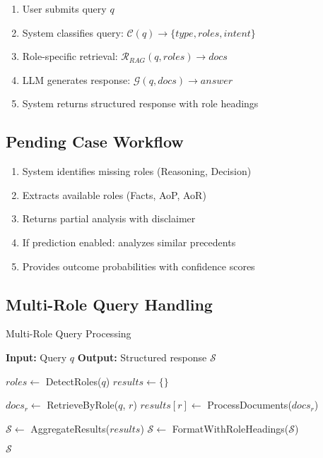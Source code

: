 \documentclass[12pt,a4paper]{article}
\begin{document}
\begin{enumerate}
    \item User submits query $q$
    \item System classifies query: $\mathcal{C}(q) \rightarrow \{type, roles, intent\}$
    \item Role-specific retrieval: $\mathcal{R}_{RAG}(q, roles) \rightarrow docs$
    \item LLM generates response: $\mathcal{G}(q, docs) \rightarrow answer$
    \item System returns structured response with role headings
\end{enumerate}

\subsection{Pending Case Workflow}

\begin{enumerate}
    \item System identifies missing roles (Reasoning, Decision)
    \item Extracts available roles (Facts, AoP, AoR)
    \item Returns partial analysis with disclaimer
    \item If prediction enabled: analyzes similar precedents
    \item Provides outcome probabilities with confidence scores
\end{enumerate}

\subsection{Multi-Role Query Handling}

\begin{algorithm}
\caption{Multi-Role Query Processing}
\begin{algorithmic}[1]
\STATE \textbf{Input:} Query $q$
\STATE \textbf{Output:} Structured response $\mathcal{S}$

\STATE $roles \leftarrow$ DetectRoles($q$)
\STATE $results \leftarrow \{\}$

    \STATE $docs_r \leftarrow$ RetrieveByRole($q$, $r$)
    \STATE $results[r] \leftarrow$ ProcessDocuments($docs_r$)
\ENDFOR

\STATE $\mathcal{S} \leftarrow$ AggregateResults($results$)
\STATE $\mathcal{S} \leftarrow$ FormatWithRoleHeadings($\mathcal{S}$)

\RETURN $\mathcal{S}$
\end{algorithmic}
\end{algorithm}
\end{document}
